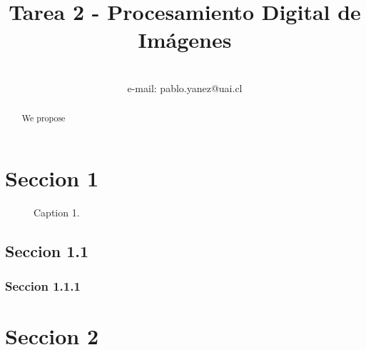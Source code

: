 \documentclass[
  letterpaper,
  twocolumn,
  9pt,
  journal,
  final]{IEEEtran}
\title{Tarea 2 - Procesamiento Digital de Imágenes}
\author{
  \IEEEauthorblockN{Pablo Yáñez S.} \\
  e-mail: pablo.yanez@uai.cl
}
\begin{document}
\maketitle

\begin{abstract}
We propose \lipsum[1]
\end{abstract}

\tableofcontents




\section{Seccion 1}
\lipsum[1]

\begin{figure}[tbh!]
  \begin{center}
  \end{center}
  \caption{Caption 1.} \label{fig:texto referenecia}
\end{figure}

\subsection{Seccion 1.1}
\lipsum[1]

\subsubsection{Seccion 1.1.1}
\lipsum[1]

\section{Seccion 2}
\end{document}
